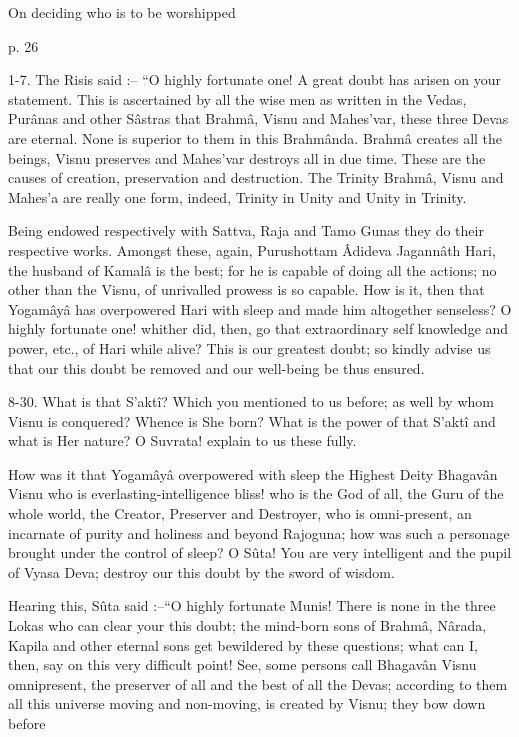 On deciding who is to be worshipped

 

p. 26

 

1-7. The Risis said :-- “O highly fortunate one! A great doubt has arisen on your statement. This is ascertained by all the wise men as written in the Vedas, Purânas and other Sâstras that Brahmâ, Visnu and Mahes'var, these three Devas are eternal. None is superior to them in this Brahmânda. Brahmâ creates all the beings, Visnu preserves and Mahes'var destroys all in due time. These are the causes of creation, preservation and destruction. The Trinity Brahmâ, Visnu and Mahes'a are really one form, indeed, Trinity in Unity and Unity in Trinity.

 

Being endowed respectively with Sattva, Raja and Tamo Gunas they do their respective works. Amongst these, again, Purushottam Âdideva Jagannâth Hari, the husband of Kamalâ is the best; for he is capable of doing all the actions; no other than the Visnu, of unrivalled prowess is so capable. How is it, then that Yogamâyâ has overpowered Hari with sleep and made him altogether senseless? O highly fortunate one! whither did, then, go that extraordinary self knowledge and power, etc., of Hari while alive? This is our greatest doubt; so kindly advise us that our this doubt be removed and our well-being be thus ensured.

 

8-30. What is that S’aktî? Which you mentioned to us before; as well by whom Visnu is conquered? Whence is She born? What is the power of that S’aktî and what is Her nature? O Suvrata! explain to us these fully.

 

How was it that Yogamâyâ overpowered with sleep the Highest Deity Bhagavân Visnu who is everlasting-intelligence bliss! who is the God of all, the Guru of the whole world, the Creator, Preserver and Destroyer, who is omni-present, an incarnate of purity and holiness and beyond Rajoguna; how was such a personage brought under the control of sleep? O Sûta! You are very intelligent and the pupil of Vyasa Deva; destroy our this doubt by the sword of wisdom.

 

Hearing this, Sûta said :--“O highly fortunate Munis! There is none in the three Lokas who can clear your this doubt; the mind-born sons of Brahmâ, Nârada, Kapila and other eternal sons get bewildered by these questions; what can I, then, say on this very difficult point! See, some persons call Bhagavân Visnu omnipresent, the preserver of all and the best of all the Devas; according to them all this universe moving and non-moving, is created by Visnu; they bow down before

